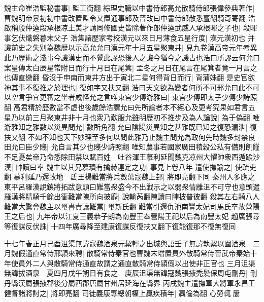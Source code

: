 魏主命崔浩監秘書事|{
	監工銜翻}
綜理史職以中書侍郎高允散騎侍郎張偉參典著作|{
	曹魏明帝景初初中書改置監令又置通事郎及晉改曰中書侍郎散悉亶翻騎奇寄翻}
浩啟稱殷仲逵段承根凉土美才請同修國史皆除著作郎仲逵武威人承根暉之子也|{
	段暉事乞伏熾磐暮末父子}
浩集諸歷家考校漢元以來日月薄食五星行度|{
	漢元漢初也}
并譏前史之失别為魏歷以示高允允曰漢元年十月五星聚東井|{
	見九卷漢高帝元年考異}
此乃歷術之淺事今譏漢史而不覺此謬恐後人之譏今猶今之譏古也浩曰所謬云何允曰案星傳太白辰星常附日而行十月日在尾箕|{
	孟冬之月日在尾言在尾箕者竟一月言之也傳直戀翻}
昏沒于申南而東井方出于寅北二星何得背日而行|{
	背蒲妹翻}
是史官欲神其事不復推之於理也|{
	復如字又扶又翻}
浩曰天文欲為變者何所不可邪允曰此不可以空言爭宜更審之坐者咸怪允之言唯東宫少傅游雅曰|{
	東宫少傅即太子少傅少詩照翻}
高君精於歷數當不虚也後歲餘浩謂允曰先所論者本不經心及更考究果如君言五星乃以前三月聚東井非十月也衆乃歎服允雖明歷初不推步及為人論說|{
	為于偽翻}
唯游雅知之雅數以災異問允|{
	數所角翻}
允曰隂陽災異知之甚難既已知之復恐漏泄|{
	復扶又翻}
不如不知也天下妙理至多何以問此雅乃止魏主問允為政何先時魏多封禁良田允曰臣少賤|{
	允自言其少也賤少詩照翻}
唯知農事若國家廣田積穀公私有備則飢饉不足憂矣帝乃命悉除田禁以賦百姓　吐谷渾王慕利延聞魏克凉州大懼帥衆西遁踰沙漠|{
	帥讀曰率}
魏主以其兄慕璝有擒赫連定之功|{
	事見上卷八年}
遣使撫諭之|{
	使疏吏翻}
慕利延乃還故地　氐王楊難當將兵數萬寇魏上邽|{
	將即亮翻下同}
秦州人多應之東平呂羅漢說鎮將拓跋意頭曰難當衆盛今不出戰示之以弱衆情離沮不可守也意頭遣羅漢將精騎千餘出衝難當陳所向披靡|{
	說輸芮翻陳讀曰陣披普彼翻}
殺其左右騎八人難當大驚會魏主以璽書責讓難當|{
	璽斯氏翻}
難當引還仇池南豐太妃司馬氏卒故營陽王之后也|{
	九年帝以江夏王義恭子朗為南豐王奉營陽王祀以后為南豐太妃}
趙廣張尋等復謀反伏誅|{
	十四年廣尋降至建康復謀反復扶又翻下復能復那不復無復同}


十七年春正月己酉沮渠無諱寇魏酒泉元絜輕之出城與語壬子無諱執絜以圍酒泉　二月魏假通直常侍邢頴來聘|{
	散騎常侍秦官也曹魏末增置員外散騎常侍晉武帝秦始十年使員外二人與散騎常侍通直故謂之通直散騎常侍頴假以出使非正官也}
三月沮渠無諱拔酒泉　夏四月戊午朔日有食之　庚辰沮渠無諱寇魏張掖禿髪保周屯刪丹|{
	刪丹縣漢屬張掖郡後分屬西郡唐屬甘州居延海在縣界}
丙戌魏主遣撫軍大將軍永昌王健督諸將討之|{
	將即亮翻}
司徒義康專總朝權上羸疾積年|{
	羸倫為翻}
心勞輒屢

